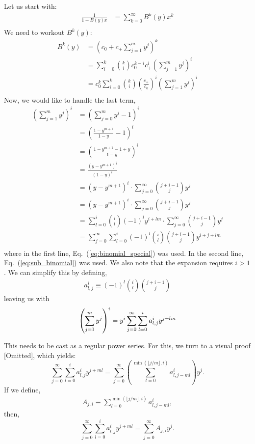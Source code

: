 	Let us start with:
	\begin{align}
		\frac{1}{1- B(y)x} &= \sum_{k=0}^\infty B^k(y)x^k \\
	\end{align}
	We need to workout $B^k(y)$:
	\begin{align}
	B^k(y) &= \left( c_0 + c_+ \sum_{j=1}^m y^j\right)^k  \\
		&= \sum_{i=0}^k {k \choose i} c_0^{k-i} c_+^i \left(\sum_{j=1}^m y^j\right)^i  \\
		&= c_0^k \sum_{i=0}^k {k \choose i}  \left(\frac{c_+}{c_0}\right)^i \left( \sum_{j=1}^m y^j\right)^i  \\
	\end{align}
	Now, we would like to handle the last term,
	\begin{align}
	\left( \sum_{j=1}^m y^j \right)^i &=  \left( \sum_{j=0}^m y^j - 1 \right)^i \\
		&= \left( \frac{1 - y^{m+1}}{1 - y} - 1 \right)^i \\
		&= \left( \frac{1 - y^{m+1} - 1 + y}{1 - y} \right)^i\\
		&= \frac{(y - y^{m+1})^i}{(1 - y)^i} \\
		&= (y - y^{m+1})^i \cdot \sum_{j=0}^\infty {j+i-1\choose j}y^j \\
		&= (y - y^{m+1})^i \cdot \sum_{j=0}^\infty {j+i-1\choose j}y^j \\
		&= \sum_{l=0}^i {i \choose l} (-1)^l y^{i+lm} \cdot \sum_{j=0}^\infty {j+i-1\choose j}y^j \\
		&= \sum_{j=0}^\infty\sum_{l=0}^i  (-1)^l  {i \choose l} {j+i-1\choose j}y^{i+j+lm} \\
	\end{align}
	where in the first line, Eq.~(\ref{eq:binomial_special}) was used. In the second line, Eq.~(\ref{eq:sub_binomial}) was used. We also note that the expansion requires $i>1$.
	We can simplify this by defining,
	\begin{align}
		a_{l, j}^i \equiv (-1)^l  {i \choose l} {j+i-1\choose j}
	\end{align}
	leaving us with
	\begin{equation}
		\left( \sum_{j=1}^m y^j \right)^i = y^i\sum_{j=0}^\infty\sum_{l=0}^i  a_{l, j}^i y^{j+lm} \\
	\end{equation}

	This needs to be cast as a regular power series. For this, we turn to a visual proof [Omitted], which yields:
	\begin{equation}
		\sum_{j=0}^\infty \sum_{l=0}^i a_{l, j}^i y^{j + ml} = \sum_{j=0}^\infty \left( \sum_{l=0}^{\min(\lfloor j / m \rfloor, i)} a_{l, j-ml}^i\right)y^j.
	\end{equation}
	If we define,
	\begin{align}
		A_{j, i} \equiv \sum_{l=0}^{\min(\lfloor j / m \rfloor, i)} a_{l, j-ml}^i,
	\end{align}
	then,
	\begin{equation}
		\sum_{j=0}^\infty \sum_{l=0}^i a_{l, j}^i y^{j+ml} = \sum_{j=0}^\infty A_{j, i}y^j.
	\end{equation}



